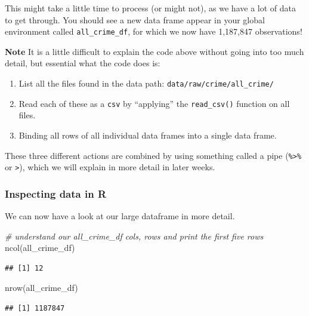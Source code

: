 \documentclass[
]{book}
\newenvironment{Shaded}{\begin{snugshade}}{\end{snugshade}}
\newcommand{\CommentTok}[1]{\textcolor[rgb]{0.56,0.35,0.01}{\textit{#1}}}
\newcommand{\FunctionTok}[1]{\textcolor[rgb]{0.00,0.00,0.00}{#1}}
\newcommand{\NormalTok}[1]{#1}
\providecommand{\tightlist}{%
  \setlength{\itemsep}{0pt}\setlength{\parskip}{0pt}}
\begin{document}
This might take a little time to process (or might not), as we have a lot of data to get through. You should see a new data frame appear in your global environment called \texttt{all\_crime\_df}, for which we now have 1,187,847 observations!

\textbf{Note}
It is a little difficult to explain the code above without going into too much detail, but essential what the code does is:

\begin{enumerate}
\def\labelenumi{\arabic{enumi}.}
\tightlist
\item
  List all the files found in the data path: \texttt{data/raw/crime/all\_crime/}
\item
  Read each of these as a \texttt{csv} by ``applying'' the \texttt{read\_csv()} function on all files.
\item
  Binding all rows of all individual data frames into a single data frame.
\end{enumerate}

These three different actions are combined by using something called a pipe (\texttt{\%\textgreater{}\%} or \texttt{\textbar{}\textgreater{}}), which we will explain in more detail in later weeks.

\hypertarget{inspecting-data-in-r}{%
\subsubsection{Inspecting data in R}\label{inspecting-data-in-r}}

We can now have a look at our large dataframe in more detail.

\begin{Shaded}
\begin{Highlighting}[]
\CommentTok{\# understand our all\_crime\_df cols, rows and print the first five rows}
\FunctionTok{ncol}\NormalTok{(all\_crime\_df)}
\end{Highlighting}
\end{Shaded}

\begin{verbatim}
## [1] 12
\end{verbatim}

\begin{Shaded}
\begin{Highlighting}[]
\FunctionTok{nrow}\NormalTok{(all\_crime\_df)}
\end{Highlighting}
\end{Shaded}

\begin{verbatim}
## [1] 1187847
\end{verbatim}
\end{document}
